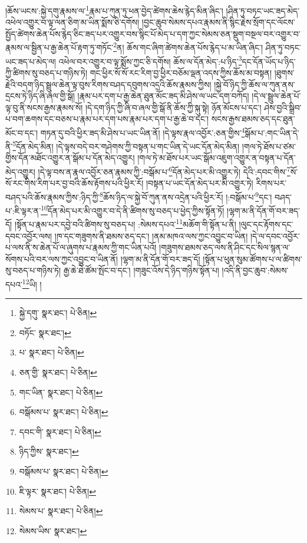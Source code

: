 །ཆོས་ཡངས་:སྐྱེ་དགུ་རྣམས་ལ་\footnote{སྐྱེ་དགུ་  སྣར་ཐང་།  པེ་ཅིན། }རྣམ་པ་ཀུན་ཏུ་ཕན་བྱེད་ཚེགས་ཆེས་རྙེད་མིན་ཞིང་། །ཤིན་ཏུ་བཏང་ཡང་ཟད་མེད་འཕེལ་འགྱུར་བ་ལྟ་ལན་ཅིག་མ་ཡིན་སྨོས་ཅི་དགོས། །བྱང་ཆུབ་སེམས་དཔའ་རྣམས་ནི་སྙིང་རྗེས་སྲོག་དང་ལོངས་སྤྱོད་ཚེགས་ཆེན་པོས་རྙེད་ཅིང་ཟད་པར་འགྱུར་བས་སྙིང་པོ་མེད་པ་དག་ཀྱང་སེམས་ཅན་སྡུག་བསྔལ་བར་འགྱུར་བ་རྣམས་ལ་སྦྱིན་པ་རྒྱ་ཆེན་པོ་རྟག་ཏུ་གཏོང་\footnote{བཏོང་  སྣར་ཐང་། }ན། ཆོས་གང་ཞིག་ཚེགས་ཆེན་པོས་རྙེད་པ་མ་ཡིན་ཞིང་། ཤིན་ཏུ་བཏང་ཡང་ཟད་པ་མེད་ལ། འཕེལ་བར་འགྱུར་བ་ལྟ་སྨོས་ཀྱང་ཅི་དགོས། ཆོས་ལ་དོན་མེད་:པ་ཉིད་\footnote{པ་  སྣར་ཐང་།  པེ་ཅིན། }དང་དོན་ཡོད་པ་ཉིད་ཀྱི་ཚིགས་སུ་བཅད་པ་གཉིས་ཏེ། གང་ཕྱིར་སོ་སོ་རང་རིག་བྱ་ཕྱིར་བཅོམ་ལྡན་འདས་ཀྱིས་ཆོས་མ་བསྟན། །ཐུགས་རྗེའི་བདག་ཉིད་སྦྲུལ་ཆེན་ལྟ་བུས་རིགས་བཤད་དབུགས་འདྲའི་ཆོས་རྣམས་ཀྱིས། །སྐྱེ་བོ་ཉིད་ཀྱི་ཆོས་ལ་ཀུན་ནས་དྲངས་ཏེ་ཉིད་ཞི་ཞལ་གྱི་སྒོ། །རྣམ་པར་དག་པ་རྒྱ་ཆེན་ཐུན་མོང་ཟད་མི་ཤེས་ལ་ཡང་དག་བཀོད། །དེ་ལ་སྦྲུལ་ཆེན་པོ་ལྟ་བུ་ནི་སངས་རྒྱས་རྣམས་སོ། །དེ་དག་ཉིད་ཀྱི་ཞི་བ་ཞལ་གྱི་སྒོ་ནི་ཆོས་ཀྱི་སྐུ་སྟེ། ཉོན་མོངས་པ་དང་། ཤེས་བྱའི་སྒྲིབ་པ་བག་ཆགས་དང་བཅས་པ་རྣམ་པར་དག་པས་རྣམ་པར་དག་པ་རྒྱ་ཆེ་བ་དང་། སངས་རྒྱས་ཐམས་ཅད་དང་ཐུན་མོང་བ་དང་། གཏན་དུ་བའི་ཕྱིར་ཟད་མི་ཤེས་པ་ཡང་ཡིན་ནོ། །དེ་ལྟས་རྣལ་འབྱོར་:ཅན་གྱིས་\footnote{ཅན་གྱི་  སྣར་ཐང་།  པེ་ཅིན། }སྒོམ་པ་:གང་ཡིན་དེ་ནི་\footnote{གང་ཡིན་  སྣར་ཐང་།  པེ་ཅིན། }དོན་མེད་མིན། །དེ་ལྟས་བདེ་བར་གཤེགས་ཀྱི་བསྟན་པ་གང་ཡིན་དེ་ཡང་དོན་མེད་མིན། །གལ་ཏེ་ཐོས་པ་ཙམ་གྱིས་དོན་མཐོང་འགྱུར་ན་སྒོམ་པ་དོན་མེད་འགྱུར། །གལ་ཏེ་མ་ཐོས་པར་ཡང་སྒོམ་འཇུག་འགྱུར་ན་བསྟན་པ་དོན་མེད་འགྱུར། །དེ་ལྟ་བས་ན་རྣལ་འབྱོར་ཅན་རྣམས་ཀྱི་:བསྒོམ་པ་\footnote{བསྒོམས་པ་  སྣར་ཐང་།  པེ་ཅིན། }དོན་མེད་པར་མི་འགྱུར་ཏེ། དེའི་:དབང་གིས་\footnote{དབང་གི་  སྣར་ཐང་།  པེ་ཅིན། }སོ་སོ་རང་གིས་རིག་པར་བྱ་བའི་ཆོས་རྟོགས་པའི་ཕྱིར་རོ། །བསྟན་པ་ཡང་དོན་མེད་པར་མི་འགྱུར་ཏེ། རིགས་པར་བཤད་པའི་ཆོས་རྣམས་ཀྱིས་:ཉིད་ཀྱི་\footnote{ཉིད་ཀྱིས་  སྣར་ཐང་། }ཆོས་ཉིད་ལ་སྐྱེ་བོ་ཀུན་ནས་འདྲེན་པའི་ཕྱིར་རོ། །:བསྒོམ་པ་\footnote{བསྒོམས་པ་  སྣར་ཐང་།  པེ་ཅིན། }དང་། བཤད་པ་:ཇི་ལྟར་ན་\footnote{ཇི་ལྟར་  སྣར་ཐང་།  པེ་ཅིན། }དོན་མེད་པར་མི་འགྱུར་བ་དེ་ནི་ཚིགས་སུ་བཅད་པ་ཕྱེད་ཀྱིས་སྟོན་ཏོ། །ལྷག་མ་ནི་དོན་གོ་བར་ཟད་དོ། །སྟོན་པ་རྣམ་པར་དབྱེ་བའི་ཚིགས་སུ་བཅད་པ། :སེམས་དཔའ་\footnote{སེམས་པ་  སྣར་ཐང་།  པེ་ཅིན། }མཆོག་གི་སྟོན་པ་ནི། །ལུང་དང་རྟོགས་དང་དབང་འབྱོར་ལས། །ཁ་དང་གཟུགས་ནི་ཐམས་ཅད་དང་། །ནམ་མཁའ་ལས་ཀྱང་འབྱུང་བ་ཡིན། །དེ་ལ་དབང་འབྱོར་པ་ལས་ནི་ས་ཆེན་པོ་ལ་ཞུགས་པ་རྣམས་ཀྱི་གང་ཡིན་པའོ། །གཟུགས་ཐམས་ཅད་ལས་ནི་ཤིང་དང་སིལ་སྙན་ལ་སོགས་པའི་བར་ལས་ཀྱང་འབྱུང་བ་ཡིན་ནོ། །ལྷག་མ་ནི་དོན་གོ་བར་ཟད་དོ། །སྟོན་པ་ཕུན་སུམ་ཚོགས་པ་ལ་ཚིགས་སུ་བཅད་པ་གཉིས་ཏེ། རྒྱ་ཆེ་ཐེ་ཚོམ་སྤོང་བ་དང་། །གཟུང་འོས་དེ་ཉིད་གཉིས་སྟོན་པ། །འདི་ནི་བྱང་ཆུབ་:སེམས་དཔའ་\footnote{སེམས་ཡིས་  སྣར་ཐང་། }ཡི། །
